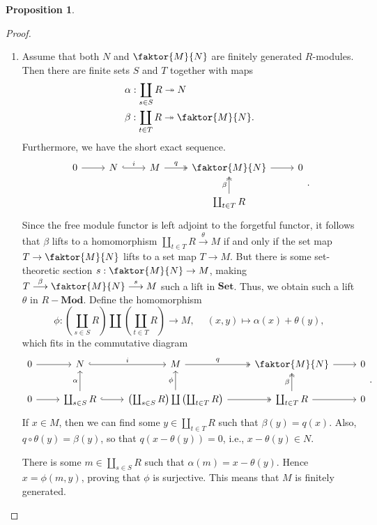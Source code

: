 \documentclass[10pt,letterpaper,cm]{nupset}
\theoremstyle{definition}
\theoremstyle{theorem}
\newtheorem{prop}[definition]{Proposition}
\theoremstyle{remark}
\newcommand{\1}{\mathbf{1}}
\newcommand{\0}{\vec 0}
\begin{document}
\begin{prop}
\begin{proof}
\begin{enumerate}[label=(\arabic*)]
\item Assume that both $N$ and $\faktor{M}{N}$ are finitely generated $R$-modules. Then there are finite sets $S$ and $T$ together with maps
\begin{align*}
& \alpha: \coprod_{s\in S}R \twoheadrightarrow N  \\
& \beta : \coprod_{t\in T} R \twoheadrightarrow \faktor{M}{N}.
\end{align*}
Furthermore, we have the short exact sequence.
\[\begin{tikzcd}
0 \arrow[r] & N \arrow[r, "i", hook] & M \arrow[r, "q", two heads] & \faktor{M}{N} \arrow[r] & 0 \\
 &  &  & \coprod_{t\in T}R \arrow[u, "\beta", two heads] & 
\end{tikzcd}
.\]
Since the free module functor is left adjoint to the forgetful functor, it follows that $\beta$ lifts to a homomorphism $ \coprod_{t\in T}R \overset{\theta}{\longrightarrow} M$  if and only if the set map $T \to \faktor{M}{N}$ lifts to a set map $T \to M$. But there is some set-theoretic section $s: \faktor{M}{N} \to M$, making $T \overset{\beta}{\longrightarrow} \faktor{M}{N} \overset{s}{\longrightarrow} M$ such a lift in $\mathbf{Set}$. Thus, we obtain such a lift $\theta$ in $R{-}\mathbf{Mod}$. Define the homomorphism $$\phi : \left(\coprod_{s\in S} R\right) \coprod \left(\coprod_{t\in T} R\right)\to M,\ \quad (x,y) \mapsto \alpha(x) + \theta(y),$$ which fits in the commutative diagram
\[
\begin{tikzcd}
0 \arrow[r] & N \arrow[r, "i", hook] & M \arrow[r, "q", two heads] & \faktor{M}{N} \arrow[r] & 0 \\
0 \arrow[r] & \coprod_{s\in S}R \arrow[u, "\alpha"] \arrow[r, hook] & \left(\coprod_{s\in S} R\right) \coprod \left(\coprod_{t\in T} R\right) \arrow[u, "\phi"] \arrow[r, two heads] & \coprod_{t\in T}R \arrow[u, "\beta", two heads] \arrow[r] & 0
\end{tikzcd}.
\] 
If $x\in M$, then we can find some $y\in \coprod_{t\in T}R$ such that $\beta(y) = q(x)$. Also, $q\circ \theta(y) = \beta(y)$, so that $q(x- \theta(y) ) = 0$, i.e., $x-\theta(y) \in N$. 

There is some $m\in \coprod_{s\in S}R$ such that $\alpha(m) = x-\theta(y)$. Hence $x= \phi(m,y)$, proving that $\phi$ is surjective. This means that $M$ is finitely generated.
\end{enumerate}
\end{proof}
\end{prop}
\end{document}
